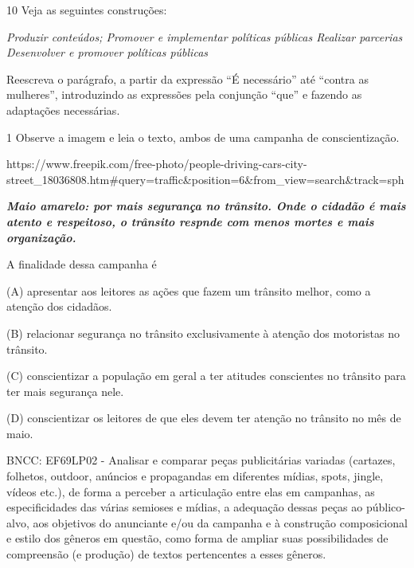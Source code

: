 \begin{itemize}
\num{10} Veja as seguintes construções:

\emph{Produzir conteúdos; Promover e implementar políticas públicas
Realizar parcerias Desenvolver e promover políticas públicas}

Reescreva o parágrafo, a partir da expressão ``É necessário'' até
``contra as mulheres'', introduzindo as expressões pela conjunção
``que'' e fazendo as adaptações necessárias.



\num{1} Observe a imagem e leia o texto, ambos de uma campanha de
conscientização.

https://www.freepik.com/free-photo/people-driving-cars-city-street\_18036808.htm\#query=traffic\&position=6\&from\_view=search\&track=sph

\textbf{\emph{Maio amarelo: por mais segurança no trânsito. Onde o
cidadão é mais atento e respeitoso, o trânsito respnde com menos mortes
e mais organização.}}

A finalidade dessa campanha é

(A) apresentar aos leitores as ações que fazem um trânsito melhor, como
a atenção dos cidadãos.

(B) relacionar segurança no trânsito exclusivamente à atenção dos
motoristas no trânsito.

(C) conscientizar a população em geral a ter atitudes conscientes no
trânsito para ter mais segurança nele.

(D) conscientizar os leitores de que eles devem ter atenção no trânsito
no mês de maio.

BNCC: EF69LP02 - Analisar e comparar peças publicitárias variadas
(cartazes, folhetos, outdoor, anúncios e propagandas em diferentes
mídias, spots, jingle, vídeos etc.), de forma a perceber a articulação
entre elas em campanhas, as especificidades das várias semioses e
mídias, a adequação dessas peças ao público-alvo, aos objetivos do
anunciante e/ou da campanha e à construção composicional e estilo dos
gêneros em questão, como forma de ampliar suas possibilidades de
compreensão (e produção) de textos pertencentes a esses gêneros.


\end{itemize}
